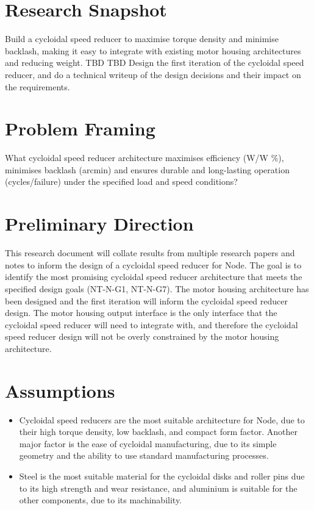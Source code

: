 \documentclass[internal]{../../../classes/nervtech-research}
\begin{document}
\maketitle
\tableofcontents
\newpage

\section{Research Snapshot}
\researchsnapshot
{Build a cycloidal speed reducer to maximise torque density and minimise backlash, making it easy to integrate with existing motor housing architectures and reducing weight.}
{TBD}
{TBD}
{Design the first iteration of the cycloidal speed reducer, and do a technical writeup of the design decisions and their impact on the requirements.}

\section{Problem Framing}
\begin{researchquestion}
  What cycloidal speed reducer architecture maximises efficiency (W/W \%), minimises backlash (arcmin) and ensures durable and long-lasting operation (cycles/failure) under the specified load and speed conditions?
\end{researchquestion}

\section{Preliminary Direction}
This research document will collate results from multiple research papers and notes to
inform the design of a cycloidal speed reducer for Node.
The goal is to identify the most promising cycloidal speed reducer architecture that
meets the specified design goals (NT-N-G1, NT-N-G7).
The motor housing architecture has been designed and the first iteration will inform
the cycloidal speed reducer design.
The motor housing output interface is the only interface that the cycloidal speed
reducer will need to integrate with, and therefore the cycloidal speed reducer design
will not be overly constrained by the motor housing architecture.

\section{Assumptions}
\begin{itemize}
  \item Cycloidal speed reducers are the most suitable architecture for Node, due to
         their high torque density, low backlash, and compact form factor. Another
        major factor is the ease of cycloidal manufacturing, due to its simple geometry
         and the ability to use standard manufacturing processes.
  \item Steel is the most suitable material for the cycloidal disks and roller pins due
         to its high strength and wear resistance, and aluminium is suitable for the
        other components, due to its machinability.
\end{itemize}
\end{document}
